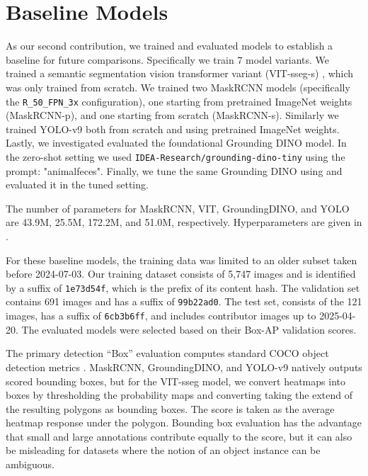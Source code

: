 \section{Baseline Models}
\label{sec:models}



As our second contribution, we trained and evaluated models to establish a baseline for future comparisons.
Specifically we train 7 model variants.
We trained a semantic segmentation vision transformer variant (VIT-sseg-s)
  \cite{Greenwell_2024_WACV,crall_geowatch_2024}, which was only trained from scratch.
We trained two MaskRCNN \cite{he2017mask} models (specifically the \texttt{R\_50\_FPN\_3x} configuration),
  one starting from pretrained ImageNet weights (MaskRCNN-p), and one starting from scratch
  (MaskRCNN-s).
Similarly we trained YOLO-v9 \cite{wang2024yolov9} both from scratch and using pretrained ImageNet weights.
Lastly, we investigated evaluated the foundational Grounding DINO \cite{liu_grounding_2024} model. 
In the zero-shot setting we used \texttt{IDEA-Research/grounding-dino-tiny} using the prompt: "animalfeces".
Finally, we tune the same Grounding DINO using \cite{OpenGroundingDino} and evaluated it in the tuned setting.

The number of parameters for MaskRCNN, VIT, GroundingDINO, and YOLO are 43.9M, 25.5M, 172.2M, and 51.0M,
  respectively.
Hyperparameters are given in .

For these baseline models, the training data was limited to an older subset taken before 2024-07-03.
Our training dataset consists of 5,747 images and is identified by a suffix of {\tt 1e73d54f}, which is the
  prefix of its content hash.
The validation set contains 691 images and has a suffix of {\tt 99b22ad0}.
The test set, consists of the 121 images, has a suffix of {\tt 6cb3b6ff}, and includes contributor images
  up to 2025-04-20.
The evaluated models were selected based on their Box-AP validation scores.

The primary detection ``Box'' evaluation computes standard COCO object detection metrics
  \cite{lin_microsoft_2014}.
MaskRCNN, GroundingDINO, and YOLO-v9 natively outputs scored bounding boxes, but for the VIT-sseg model, we convert heatmaps into boxes
  by thresholding the probability maps and converting taking the extend of the resulting polygons as bounding
  boxes.
The score is taken as the average heatmap response under the polygon.
Bounding box evaluation has the advantage that small and large annotations contribute equally to the score,
  but it can also be misleading for datasets where the notion of an object instance can be ambiguous.

